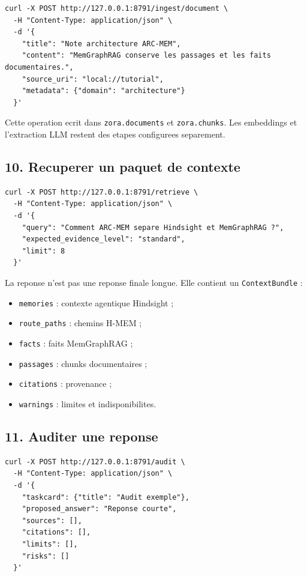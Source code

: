 \documentclass[11pt,a4paper]{article}
\begin{document}
\begin{lstlisting}
curl -X POST http://127.0.0.1:8791/ingest/document \
  -H "Content-Type: application/json" \
  -d '{
    "title": "Note architecture ARC-MEM",
    "content": "MemGraphRAG conserve les passages et les faits documentaires.",
    "source_uri": "local://tutorial",
    "metadata": {"domain": "architecture"}
  }'
\end{lstlisting}

Cette operation ecrit dans \texttt{zora.documents} et \texttt{zora.chunks}. Les
embeddings et l'extraction LLM restent des etapes configurees separement.

\subsection{10. Recuperer un paquet de contexte}

\begin{lstlisting}
curl -X POST http://127.0.0.1:8791/retrieve \
  -H "Content-Type: application/json" \
  -d '{
    "query": "Comment ARC-MEM separe Hindsight et MemGraphRAG ?",
    "expected_evidence_level": "standard",
    "limit": 8
  }'
\end{lstlisting}

La reponse n'est pas une reponse finale longue. Elle contient un
\texttt{ContextBundle} :

\begin{itemize}[leftmargin=*]
  \item \texttt{memories} : contexte agentique Hindsight ;
  \item \texttt{route\_paths} : chemins H-MEM ;
  \item \texttt{facts} : faits MemGraphRAG ;
  \item \texttt{passages} : chunks documentaires ;
  \item \texttt{citations} : provenance ;
  \item \texttt{warnings} : limites et indisponibilites.
\end{itemize}

\subsection{11. Auditer une reponse}

\begin{lstlisting}
curl -X POST http://127.0.0.1:8791/audit \
  -H "Content-Type: application/json" \
  -d '{
    "taskcard": {"title": "Audit exemple"},
    "proposed_answer": "Reponse courte",
    "sources": [],
    "citations": [],
    "limits": [],
    "risks": []
  }'
\end{lstlisting}
\end{document}
